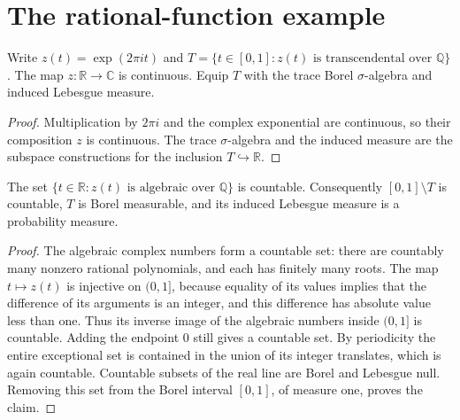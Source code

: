 \section{The rational-function example}

\begin{definition}
\label{def:rational-circle-parameters}
\leanok
Write $z(t)=\exp(2\pi it)$ and
$T=\{t\in[0,1]:z(t)\text{ is transcendental over }\mathbb Q\}$.
The map $z:\mathbb R\to\mathbb C$ is continuous. Equip $T$ with the
trace Borel $\sigma$-algebra and induced Lebesgue measure.
\end{definition}
\begin{proof}
Multiplication by $2\pi i$ and the complex exponential are continuous,
so their composition $z$ is continuous. The trace $\sigma$-algebra and
the induced measure are the subspace constructions for the inclusion
$T\hookrightarrow\mathbb R$.
\end{proof}

\begin{lemma}
\label{lem:rational-transcendental-circle-conull}
\leanok
The set $\{t\in\mathbb R:z(t)\text{ is algebraic over }\mathbb Q\}$
is countable. Consequently $[0,1]\setminus T$ is countable, $T$ is Borel
measurable, and its induced Lebesgue measure is a probability measure.
\end{lemma}
\begin{proof}
The algebraic complex numbers form a countable set: there are countably many
nonzero rational polynomials, and each has finitely many roots. The map
$t\mapsto z(t)$ is injective on $(0,1]$, because equality of its values implies
that the difference of its arguments is an integer, and this difference has
absolute value less than one. Thus its inverse image of the algebraic numbers
inside $(0,1]$ is countable. Adding the endpoint $0$ still gives a countable
set. By periodicity the entire exceptional set is contained in the union
of its integer translates, which is again countable.
Countable subsets of the real line are Borel and Lebesgue null. Removing
this set from the Borel interval $[0,1]$, of measure one, proves the claim.
\end{proof}

